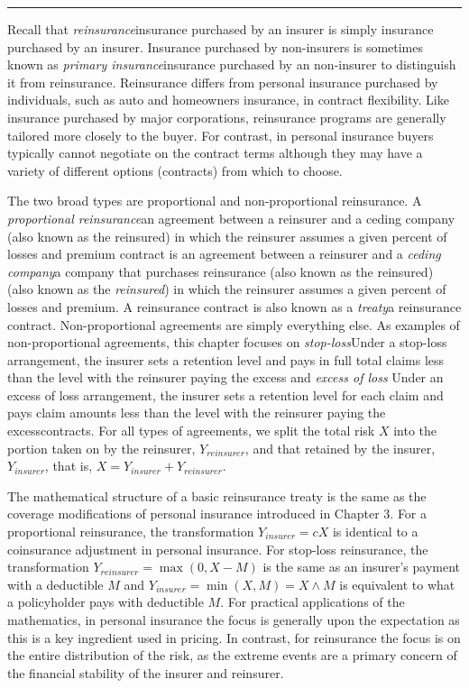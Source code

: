 \documentclass[]{book}
\theoremstyle{definition}
\theoremstyle{definition}
\theoremstyle{definition}
\theoremstyle{remark}
\begin{document}
\begin{center}\rule{0.5\linewidth}{\linethickness}\end{center}

Recall that \emph{reinsurance}{insurance purchased by an insurer} is
simply insurance purchased by an insurer. Insurance purchased by
non-insurers is sometimes known as \emph{primary insurance}{insurance
purchased by an non-insurer} to distinguish it from reinsurance.
Reinsurance differs from personal insurance purchased by individuals,
such as auto and homeowners insurance, in contract flexibility. Like
insurance purchased by major corporations, reinsurance programs are
generally tailored more closely to the buyer. For contrast, in personal
insurance buyers typically cannot negotiate on the contract terms
although they may have a variety of different options (contracts) from
which to choose.

The two broad types are proportional and non-proportional reinsurance. A
\emph{proportional reinsurance}{an agreement between a reinsurer and a
ceding company (also known as the reinsured) in which the reinsurer
assumes a given percent of losses and premium} contract is an agreement
between a reinsurer and a \emph{ceding company}{a company that purchases
reinsurance (also known as the reinsured)} (also known as the
\emph{reinsured}) in which the reinsurer assumes a given percent of
losses and premium. A reinsurance contract is also known as a
\emph{treaty}{a reinsurance contract}. Non-proportional agreements are
simply everything else. As examples of non-proportional agreements, this
chapter focuses on \emph{stop-loss}{Under a stop-loss arrangement, the
insurer sets a retention level and pays in full total claims less than
the level with the reinsurer paying the excess} and \emph{excess of
loss} {Under an excess of loss arrangement, the insurer sets a retention
level for each claim and pays claim amounts less than the level with the
reinsurer paying the excess}contracts. For all types of agreements, we
split the total risk \(X\) into the portion taken on by the reinsurer,
\(Y_{reinsurer}\), and that retained by the insurer, \(Y_{insurer}\),
that is, \(X= Y_{insurer}+Y_{reinsurer}\).

The mathematical structure of a basic reinsurance treaty is the same as
the coverage modifications of personal insurance introduced in Chapter
3. For a proportional reinsurance, the transformation
\(Y_{insurer} = c X\) is identical to a coinsurance adjustment in
personal insurance. For stop-loss reinsurance, the transformation
\(Y_{reinsurer} = \max(0,X-M)\) is the same as an insurer's payment with
a deductible \(M\) and \(Y_{insurer} = \min(X,M) = X \wedge M\) is
equivalent to what a policyholder pays with deductible \(M\). For
practical applications of the mathematics, in personal insurance the
focus is generally upon the expectation as this is a key ingredient used
in pricing. In contrast, for reinsurance the focus is on the entire
distribution of the risk, as the extreme events are a primary concern of
the financial stability of the insurer and reinsurer.
\end{document}
